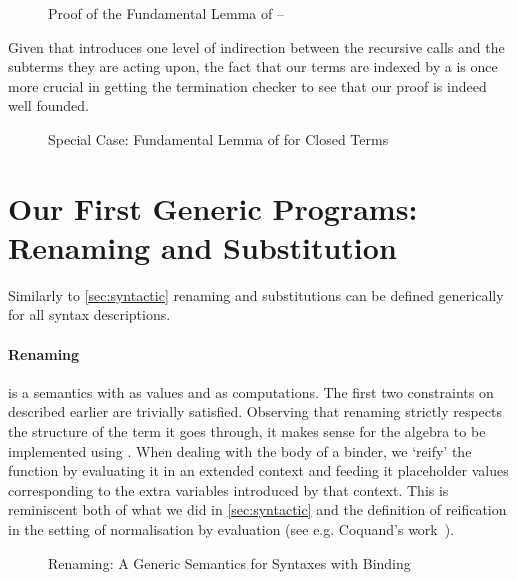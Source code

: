 \begin{figure}[h]
\caption{Proof of the Fundamental Lemma of  -- }
\end{figure}

Given that  introduces one level of indirection between the recursive
calls and the subterms they are acting upon, the fact that our terms are indexed
by a  is once more crucial in getting the termination checker to see
that our proof is indeed well founded.


\begin{figure}[h]
\caption{Special Case: Fundamental Lemma of  for Closed Terms\label{fig:closedsem}}
\end{figure}


\section{Our First Generic Programs: Renaming and Substitution}\label{section:renandsub}

Similarly to \cref{sec:syntactic} renaming and substitutions can be defined generically
for all syntax descriptions.

\paragraph{Renaming} is a semantics with  as values and  as computations.
The first two constraints on  described earlier are trivially satisfied. Observing
that renaming strictly respects the structure of the term it goes through, it makes
sense for the algebra to be implemented using . When dealing with the body
of a binder, we `reify' the  function by evaluating it in an extended
context and feeding it placeholder values corresponding to the extra variables
introduced by that context. This is reminiscent both of what we did in
\cref{sec:syntactic} and the definition of reification in the setting of normalisation
by evaluation (see e.g. Coquand's work~\citeyear{coquand2002formalised}).

\begin{figure}[h]
\caption{Renaming: A Generic Semantics for Syntaxes with Binding\label{fig:genrensem}}
\end{figure}

